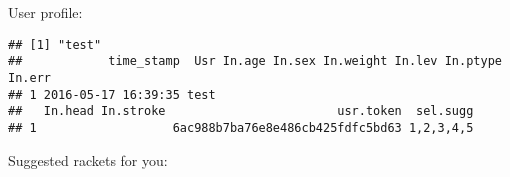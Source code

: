 \documentclass{article}
\begin{document}
User profile:

\begin{knitrout}
\color{fgcolor}\begin{kframe}
\begin{verbatim}
## [1] "test"
##            time_stamp  Usr In.age In.sex In.weight In.lev In.ptype In.err
## 1 2016-05-17 16:39:35 test                                               
##   In.head In.stroke                        usr.token  sel.sugg
## 1                   6ac988b7ba76e8e486cb425fdfc5bd63 1,2,3,4,5
\end{verbatim}
\end{kframe}
\end{knitrout}


Suggested rackets for you:
\end{document}
